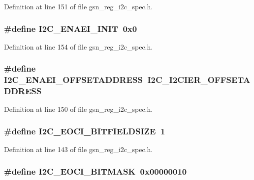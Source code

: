 Definition at line 151 of file gsn\_\-reg\_\-i2c\_\-spec.h.

\hypertarget{a00558_a0d4a32de34add75352d9bb49eda6dfc9}{
\subsubsection[{I2C\_\-ENAEI\_\-INIT}]{\setlength{\rightskip}{0pt plus 5cm}\#define I2C\_\-ENAEI\_\-INIT~0x0}}
\label{a00558_a0d4a32de34add75352d9bb49eda6dfc9}


Definition at line 154 of file gsn\_\-reg\_\-i2c\_\-spec.h.

\hypertarget{a00558_a8474ae0e4921e167cc86d66b3b7861bb}{
\subsubsection[{I2C\_\-ENAEI\_\-OFFSETADDRESS}]{\setlength{\rightskip}{0pt plus 5cm}\#define I2C\_\-ENAEI\_\-OFFSETADDRESS~I2C\_\-I2CIER\_\-OFFSETADDRESS}}
\label{a00558_a8474ae0e4921e167cc86d66b3b7861bb}


Definition at line 150 of file gsn\_\-reg\_\-i2c\_\-spec.h.

\hypertarget{a00558_ab301a0b2dc92a81343fea1e2f8626458}{
\subsubsection[{I2C\_\-EOCI\_\-BITFIELDSIZE}]{\setlength{\rightskip}{0pt plus 5cm}\#define I2C\_\-EOCI\_\-BITFIELDSIZE~1}}
\label{a00558_ab301a0b2dc92a81343fea1e2f8626458}


Definition at line 143 of file gsn\_\-reg\_\-i2c\_\-spec.h.

\hypertarget{a00558_a2d1dd1631dc699869258dd3a2b32e9fd}{
\subsubsection[{I2C\_\-EOCI\_\-BITMASK}]{\setlength{\rightskip}{0pt plus 5cm}\#define I2C\_\-EOCI\_\-BITMASK~0x00000010}}
\label{a00558_a2d1dd1631dc699869258dd3a2b32e9fd}


